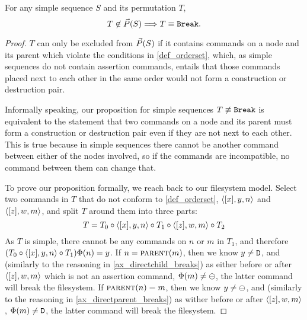 \begin{mylem}\label{order_is_only_possible}
For any simple sequence $S$ and its permutation $T$, 
\[ T\not\in\vec{P}({S}) \Longrightarrow T\equiv\mathtt{Break}. \]
\end{mylem}
\begin{proof}
$T$ can only be excluded from $\vec{P}({S})$ if it contains commands on a node and its parent
which violate the conditions in \cref{def_orderset},
which, as simple sequences do not contain assertion commands,
entails that those commands placed next to each other in the same order
would not form a construction or destruction pair.

Informally speaking,
our proposition for simple sequences $T\not\equiv\mathtt{Break}$ is equivalent to the statement that
two commands on a node and its parent must form
a construction or destruction pair even if they are not next to each other.
This is true because in simple sequences
there cannot be another command between either of the nodes involved,
so if the commands are incompatible, no command between them can change that.

To prove our proposition formally, we reach back to our filesystem model.
Select two commands in $T$ that do not conform to \cref{def_orderset}, $\langle{[x],y,n}\rangle$ and $\langle{[z],w,m}\rangle$,
and split $T$ around them into three parts:
\[ T = T_0 \circ \langle{[x],y,n}\rangle \circ T_1 \circ \langle{[z],w,m}\rangle \circ T_2 \]
As $T$ is simple, there cannot be any commands on $n$ or $m$ in $T_1$,
and therefore $(T_0\circ\langle{[x],y,n}\rangle\circ T_1)\Phi(n) = y$.
If $n=\text{\normalfont\scshape{parent}}(m)$, then we know $y\neq\mathtt{D}$, and
(similarly to the reasoning in \cref{ax_directchild_breaks})
as either before or after $\langle{[z],w,m}\rangle$ which is not an assertion command,
$\Phi(m)\neq\ominus$, the latter command will break the filesystem.
If $\text{\normalfont\scshape{parent}}(n)=m$, then we know $y\neq\ominus$, and
(similarly to the reasoning in \cref{ax_directparent_breaks})
as wither before or after $\langle{[z],w,m}\rangle$, $\Phi(m)\neq\mathtt{D}$,
the latter command will break the filesystem.
\end{proof}



